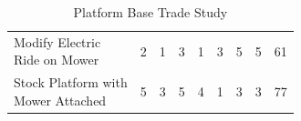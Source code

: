 \documentclass{article}
\begin{document}
\begin{table}[H]
\begin{adjustwidth}{-1.5in}{-1.5in}
\begin{tabular}{|l|c|c|c|c|c|c|c|c|}
		\makecell[l]{Modify Electric \\ Ride on Mower}         & 2                   & 1              & 3                    & 1                              & 3    & 5        & 5        & 61    \\ \hdashline
		\makecell[l]{Stock Platform with \\ Mower Attached}    & 5                   & 3              & 5                    & 4                              & 1    & 3        & 3        & 77    \\ \hline
		\end{tabular}
		\caption{Platform Base Trade Study}
		\label{my-label}
		\end{adjustwidth}
		\end{table}
		
		
\end{document}
